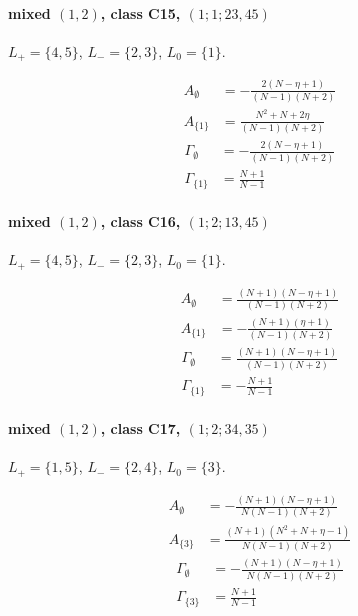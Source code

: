 \documentclass[11pt]{article}
\begin{document}
\paragraph{mixed $(1,2)$, class C15, $(1;1;23,45)$}

$L_+=\{4,5\}$, $L_-=\{2,3\}$, $L_0=\{1\}$.

\begin{align*}
  A_{\emptyset} &= - \frac{2 \left(N - \eta + 1\right)}{\left(N - 1\right) \left(N + 2\right)} \\
  A_{\{1\}} &= \frac{N^{2} + N + 2 \eta}{\left(N - 1\right) \left(N + 2\right)} 
\end{align*}
\begin{align*}
  \Gamma_{\emptyset} &= - \frac{2 \left(N - \eta + 1\right)}{\left(N - 1\right) \left(N + 2\right)} \\
  \Gamma_{\{1\}} &= \frac{N + 1}{N - 1} 
\end{align*}

\paragraph{mixed $(1,2)$, class C16, $(1;2;13,45)$}

$L_+=\{4,5\}$, $L_-=\{2,3\}$, $L_0=\{1\}$.

\begin{align*}
  A_{\emptyset} &= \frac{\left(N + 1\right) \left(N - \eta + 1\right)}{\left(N - 1\right) \left(N + 2\right)} \\
  A_{\{1\}} &= - \frac{\left(N + 1\right) \left(\eta + 1\right)}{\left(N - 1\right) \left(N + 2\right)} 
\end{align*}
\begin{align*}
  \Gamma_{\emptyset} &= \frac{\left(N + 1\right) \left(N - \eta + 1\right)}{\left(N - 1\right) \left(N + 2\right)} \\
  \Gamma_{\{1\}} &= - \frac{N + 1}{N - 1} 
\end{align*}

\paragraph{mixed $(1,2)$, class C17, $(1;2;34,35)$}

$L_+=\{1,5\}$, $L_-=\{2,4\}$, $L_0=\{3\}$.

\begin{align*}
  A_{\emptyset} &= - \frac{\left(N + 1\right) \left(N - \eta + 1\right)}{N \left(N - 1\right) \left(N + 2\right)} \\
  A_{\{3\}} &= \frac{\left(N + 1\right) \left(N^{2} + N + \eta - 1\right)}{N \left(N - 1\right) \left(N + 2\right)} 
\end{align*}
\begin{align*}
  \Gamma_{\emptyset} &= - \frac{\left(N + 1\right) \left(N - \eta + 1\right)}{N \left(N - 1\right) \left(N + 2\right)} \\
  \Gamma_{\{3\}} &= \frac{N + 1}{N - 1} 
\end{align*}
\end{document}
